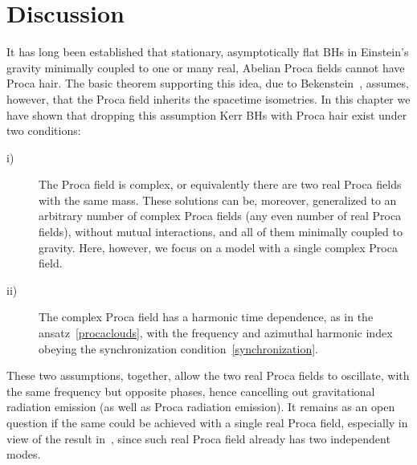\section{Discussion}
\label{sec_discussion}
It has long been established that stationary, asymptotically flat BHs in Einstein's gravity minimally coupled to one or many real, Abelian Proca fields cannot have Proca hair.
The basic theorem supporting this idea, due to Bekenstein~\cite{Bekenstein:1971hc,Bekenstein:1972ky}, assumes, however, that the Proca field inherits the spacetime isometries.
In this chapter we have shown that dropping this assumption Kerr BHs with Proca hair exist under two conditions:
\begin{description}
\item[i)] The Proca field is complex, or equivalently there are two real Proca fields with the same mass. These solutions can be, moreover, generalized to an arbitrary number of complex Proca fields (any even number of real Proca fields), without mutual interactions, and all of them minimally coupled to gravity. Here, however, we focus on a model with a single complex Proca field. 
\item[ii)] The complex Proca field has a harmonic time dependence, as in the ansatz~\eqref{procaclouds}, with the frequency and azimuthal harmonic index obeying the synchronization condition~\eqref{synchronization}.
\end{description}
These two assumptions, together, allow the two real Proca fields to oscillate, with the same frequency but opposite phases, hence cancelling out gravitational radiation emission (as well as Proca radiation emission).
It remains as an open question if the same could be achieved with a single real Proca field, especially in view of the result in~\cite{Wang:2015fgp}, since such real Proca field already has two independent modes. 

